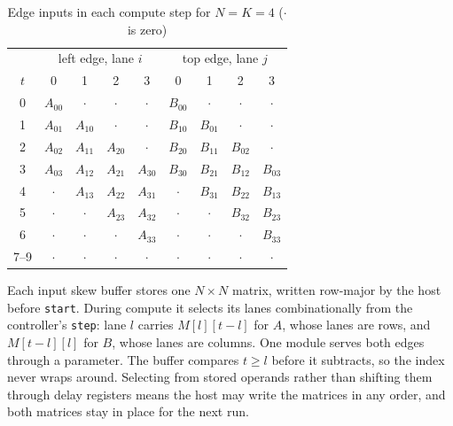 \begin{table}[t]
\centering
\caption{Edge inputs in each compute step for $N = K = 4$ ($\cdot$ is zero)}
\label{tab:skew}
\scriptsize
\setlength{\tabcolsep}{3.2pt}
\begin{tabular}{@{}c|cccc|cccc@{}}
\toprule
 & \multicolumn{4}{c|}{left edge, lane $i$} & \multicolumn{4}{c}{top edge, lane $j$} \\
$t$ & 0 & 1 & 2 & 3 & 0 & 1 & 2 & 3 \\
\midrule
0 & $A_{00}$ & $\cdot$ & $\cdot$ & $\cdot$ & $B_{00}$ & $\cdot$ & $\cdot$ & $\cdot$ \\
1 & $A_{01}$ & $A_{10}$ & $\cdot$ & $\cdot$ & $B_{10}$ & $B_{01}$ & $\cdot$ & $\cdot$ \\
2 & $A_{02}$ & $A_{11}$ & $A_{20}$ & $\cdot$ & $B_{20}$ & $B_{11}$ & $B_{02}$ & $\cdot$ \\
3 & $A_{03}$ & $A_{12}$ & $A_{21}$ & $A_{30}$ & $B_{30}$ & $B_{21}$ & $B_{12}$ & $B_{03}$ \\
4 & $\cdot$ & $A_{13}$ & $A_{22}$ & $A_{31}$ & $\cdot$ & $B_{31}$ & $B_{22}$ & $B_{13}$ \\
5 & $\cdot$ & $\cdot$ & $A_{23}$ & $A_{32}$ & $\cdot$ & $\cdot$ & $B_{32}$ & $B_{23}$ \\
6 & $\cdot$ & $\cdot$ & $\cdot$ & $A_{33}$ & $\cdot$ & $\cdot$ & $\cdot$ & $B_{33}$ \\
7--9 & $\cdot$ & $\cdot$ & $\cdot$ & $\cdot$ & $\cdot$ & $\cdot$ & $\cdot$ & $\cdot$ \\
\bottomrule
\end{tabular}
\end{table}

Each input skew buffer stores one $N \times N$ matrix, written row-major by the host before \texttt{start}. During compute it selects its lanes combinationally from the controller's \texttt{step}: lane $l$ carries $M[l][t-l]$ for $A$, whose lanes are rows, and $M[t-l][l]$ for $B$, whose lanes are columns. One module serves both edges through a parameter. The buffer compares $t \ge l$ before it subtracts, so the index never wraps around. Selecting from stored operands rather than shifting them through delay registers means the host may write the matrices in any order, and both matrices stay in place for the next run.
